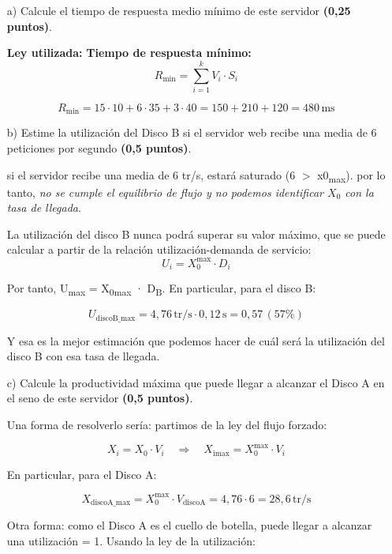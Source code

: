 \documentclass[a4paper,12pt]{article}
\begin{document}
\begin{enumerate}
    \item[a)] Calcule el tiempo de respuesta medio mínimo de este servidor \textbf{(0,25 puntos)}.

    

    \textbf{Ley utilizada:} \textbf{Tiempo de respuesta mínimo:}
    \[
    R_{\text{min}} = \sum_{i=1}^{k} V_i \cdot S_i
    \]

    \[
    R_{\text{min}} = 15 \cdot 10 + 6 \cdot 35 + 3 \cdot 40 = 150 + 210 + 120 = \boxed{480 \, \text{ms}}
    \]

    \item[b)] Estime la utilización del Disco B si el servidor web recibe una media de 6 peticiones por segundo \textbf{(0,5 puntos)}.

si el servidor recibe una media de 6 tr/s, estará saturado (6 $>$ x0\textsubscript{max}). por lo tanto, \textit{no se cumple el equilibrio de flujo y no podemos identificar $X_0$ con la tasa de llegada}.

La utilización del disco B nunca podrá superar su valor máximo, que se puede calcular a partir de la relación utilización-demanda de servicio: 
\[
U_i = X_0^{\text{max}} \cdot D_i
\]

Por tanto, U\textsubscript{max} = X\textsubscript{0max} · D\textsubscript{B}. En particular, para el disco B:

\[
U_{\text{discoB\_max}} = 4{,}76 \, \text{tr/s} \cdot 0{,}12\,\text{s} = 0{,}57 \, (57\%)
\]

Y esa es la mejor estimación que podemos hacer de cuál será la utilización del disco B con esa tasa de llegada.

\item[c)] Calcule la productividad máxima que puede llegar a alcanzar el Disco A en el seno de este servidor \textbf{(0,5 puntos)}.

Una forma de resolverlo sería: partimos de la ley del flujo forzado: 

\[
X_i = X_0 \cdot V_i
\quad \Rightarrow \quad
X_{\text{imax}} = X_0^{\text{max}} \cdot V_i
\]

En particular, para el Disco A:

\[
X_{\text{discoA\_max}} = X_0^{\text{max}} \cdot V_{\text{discoA}} = 4{,}76 \cdot 6 = \boxed{28{,}6 \, \text{tr/s}}
\]

Otra forma: como el Disco A es el cuello de botella, puede llegar a alcanzar una utilización = 1. Usando la ley de la utilización:


\end{enumerate}
\end{document}

